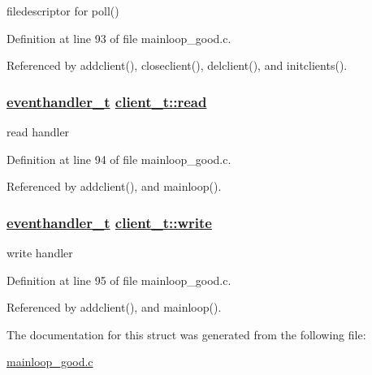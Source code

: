 filedescriptor for poll() 



Definition at line 93 of file mainloop\_\-good.c.

Referenced by addclient(), closeclient(), delclient(), and initclients().\hypertarget{structclient__t_o1}{
\subsubsection[read]{\setlength{\rightskip}{0pt plus 5cm}\hyperlink{mainloop__good_8c_a20}{eventhandler\_\-t} \hyperlink{structclient__t_o1}{client\_\-t::read}}}
\label{structclient__t_o1}


read handler 



Definition at line 94 of file mainloop\_\-good.c.

Referenced by addclient(), and mainloop().\hypertarget{structclient__t_o2}{
\subsubsection[write]{\setlength{\rightskip}{0pt plus 5cm}\hyperlink{mainloop__good_8c_a20}{eventhandler\_\-t} \hyperlink{structclient__t_o2}{client\_\-t::write}}}
\label{structclient__t_o2}


write handler 



Definition at line 95 of file mainloop\_\-good.c.

Referenced by addclient(), and mainloop().

The documentation for this struct was generated from the following file:\begin{CompactItemize}
\item 
\hyperlink{mainloop__good_8c}{mainloop\_\-good.c}\end{CompactItemize}
